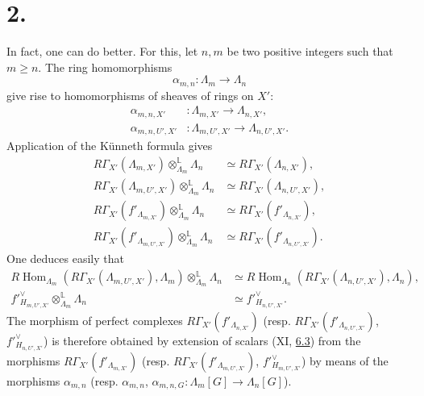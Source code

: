 \documentclass[11pt]{article}
\DeclareMathOperator{\Hom}{Hom}
\providecommand{\Hom}{\operatorname{Hom}}
\providecommand{\La}{\Lambda}
\providecommand{\Hom}{\operatorname{Hom}}
\begin{document}
\section*{2.}\label{sga5:XII:section:2}
In fact, one can do better. For this, let $n,m$ be two positive integers such that $m\ge n$. The ring homomorphisms
\[
\alpha_{m,n}:\La_m\longrightarrow \La_n
\]
give rise to homomorphisms of sheaves of rings on $X'$:
\begin{align*}
\alpha_{m,n,X'}&:\La_{m,X'}\longrightarrow \La_{n,X'},\\
\alpha_{m,n,U',X'}&:\La_{m,U',X'}\longrightarrow \La_{n,U',X'} .
\end{align*}
Application of the Künneth formula gives
\begin{align}
\tag{2.1}\label{sga5:XII:equation:2.1}R\Gamma_{X'}(\La_{m,X'})\otimes_{\La_m}^{\mathbb L}\La_n&\simeq R\Gamma_{X'}(\La_{n,X'}),\\
\tag{2.2}\label{sga5:XII:equation:2.2}R\Gamma_{X'}(\La_{m,U',X'})\otimes_{\La_m}^{\mathbb L}\La_n&\simeq R\Gamma_{X'}(\La_{n,U',X'}),\\
\tag{2.3}\label{sga5:XII:equation:2.3}R\Gamma_{X'}(f'_{\La_{m,X'}})\otimes_{\La_m}^{\mathbb L}\La_n&\simeq R\Gamma_{X'}(f'_{\La_{n,X'}}),\\
\tag{2.4}\label{sga5:XII:equation:2.4}R\Gamma_{X'}(f'_{\La_{m,U',X'}})\otimes_{\La_m}^{\mathbb L}\La_n&\simeq R\Gamma_{X'}(f'_{\La_{n,U',X'}}).
\end{align}
One deduces easily that
\begin{align}
\tag{2.5}\label{sga5:XII:equation:2.5}R\Hom_{\La_m}(R\Gamma_{X'}(\La_{m,U',X'}),\La_m)\otimes_{\La_m}^{\mathbb L}\La_n&\simeq R\Hom_{\La_n}(R\Gamma_{X'}(\La_{n,U',X'}),\La_n),\\
\tag{2.6}\label{sga5:XII:equation:2.6}f'^\vee_{H_{m,U',X'}}\otimes_{\La_m}^{\mathbb L}\La_n&\simeq f'^\vee_{H_{n,U',X'}}.
\end{align}
The morphism of perfect complexes $R\Gamma_{X'}(f'_{\La_{n,X'}})$ (resp. $R\Gamma_{X'}(f'_{\La_{n,U',X'}})$, $f'^\vee_{H_{n,U',X'}}$) is therefore obtained by extension of scalars (XI, \hyperref[sga5:XII:subsection:6.3]{6.3}) from the morphisms $R\Gamma_{X'}(f'_{\La_{m,X'}})$ (resp. $R\Gamma_{X'}(f'_{\La_{m,U',X'}})$, $f'^\vee_{H_{m,U',X'}}$) by means of the morphisms $\alpha_{m,n}$ (resp. $\alpha_{m,n}$, $\alpha_{m,n,G}:\La_m[G]\to\La_n[G]$).
\end{document}
